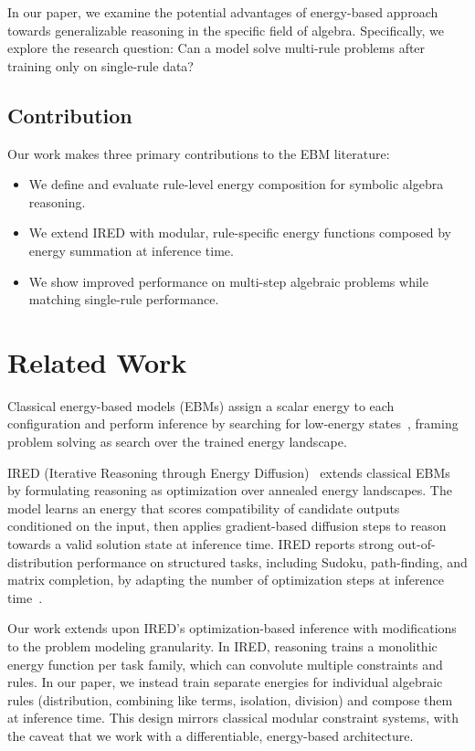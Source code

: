 \documentclass{article}
\begin{document}
In our paper, we examine the potential advantages of energy-based approach towards generalizable reasoning in the specific field of algebra. Specifically, we explore the research question: Can a model solve multi-rule problems after training only on single-rule data?
\subsection{Contribution}

Our work makes three primary contributions to the EBM literature: 
\begin{itemize}
\item We define and evaluate rule-level energy composition for symbolic algebra reasoning.
\item We extend IRED with modular, rule-specific energy functions composed by energy summation at inference time.
\item We show improved performance on multi-step algebraic problems while matching single-rule performance.
\end{itemize}


\section{Related Work}
Classical energy-based models (EBMs) assign a scalar energy to each configuration and perform inference by searching for low-energy states~\citep{lecun2006ebm}, framing problem solving as search over the trained energy landscape. 

IRED (Iterative Reasoning through Energy Diffusion)~\citep{du2024ired} extends classical EBMs by formulating reasoning as optimization over annealed energy landscapes. The model learns an energy that scores compatibility of candidate outputs conditioned on the input, then applies gradient-based diffusion steps to reason towards a valid solution state at inference time. IRED reports strong out-of-distribution performance on structured tasks, including Sudoku, path-finding, and matrix completion, by adapting the number of optimization steps at inference time~\citep{du2024ired}.

Our work extends upon IRED's optimization-based inference with modifications to the problem modeling granularity. In IRED, reasoning trains a monolithic energy function per task family, which can convolute multiple constraints and rules. In our paper, we instead train separate energies for individual algebraic rules (distribution, combining like terms, isolation, division) and compose them at inference time. This design mirrors classical modular constraint systems, with the caveat that we work with a differentiable, energy-based architecture.
\end{document}

